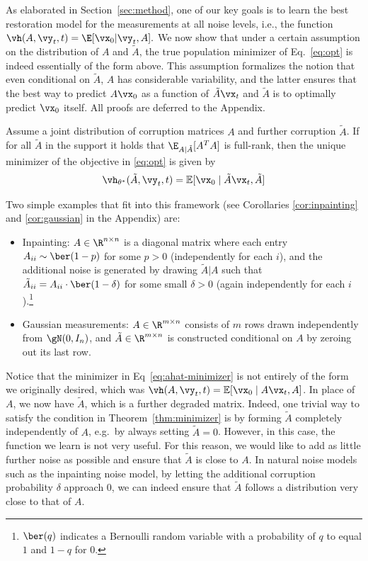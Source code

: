 \documentclass{article}
\begin{document}
As elaborated in Section~\ref{sec:method}, one of our key goals is to learn the best restoration model for the measurements at all noise levels, i.e., the function $
    \vh(A, \vy_t, t) = \E[\vx_0 | \vy_t, A].$
We now show that under a certain assumption on the distribution of $A$ and $\tilde{A}$, the true population minimizer of Eq.~\ref{eq:opt} is indeed essentially of the form above. This assumption formalizes the notion that even conditional on $\tilde{A}$, $A$ has considerable variability, and the latter ensures that the best way to predict $A\vx_0$ as a function of $\tilde{A}\vx_t$ and $\tilde{A}$ is to optimally predict $\vx_0$ itself. All proofs are deferred to the Appendix.

\begin{theorem}\label{thm:minimizer}
    Assume a joint distribution of corruption matrices $A$ and further corruption $\tilde{A}$. If for all $\tilde{A}$ in the support it holds that $\E_{A|\tilde{A}}[A^T A]$ is full-rank, then the unique minimizer of the objective in \eqref{eq:opt} is given by
    \begin{equation}\label{eq:ahat-minimizer}
        \vh_{\theta^*}(\tilde A, \vy_t, t ) = \mathbb{E}[ \vx_0 \mid \tilde{A}\vx_t, \tilde{A} ]
    \end{equation}
\end{theorem}

Two simple examples that fit into this framework (see Corollaries \ref{cor:inpainting} and \ref{cor:gaussian} in the Appendix) are: 
\begin{itemize}
    \item Inpainting: $A \in \R^{n \times n}$ is a diagonal matrix where each entry $A_{ii} \sim \ber(1-p)$ for some $p > 0$ (independently for each $i$), and the additional noise is generated by drawing $\tilde{A}|A$ such that $\tilde{A}_{ii} = A_{ii} \cdot \ber(1-\delta)$ for some small $\delta > 0$ (again independently for each $i$).\footnote{$\ber(q)$ indicates a Bernoulli random variable with a probability of $q$ to equal $1$ and $1-q$ for $0$.} 
    \item Gaussian measurements: $A \in \R^{m \times n}$ consists of $m$ rows drawn independently from $\gN(0, I_n)$, and $\tilde{A} \in \R^{m \times n}$ is constructed conditional on $A$ by zeroing out its last row.
\end{itemize}

Notice that the minimizer in Eq~\ref{eq:ahat-minimizer} is not entirely of the form we originally desired, which was $\vh(A, \vy_t, t) = \mathbb{E}[ \vx_0 \mid A\vx_t, A]$. In place of $A$, we now have $\tilde{A}$, which is a further degraded matrix. Indeed, one trivial way to satisfy the condition in Theorem~\ref{thm:minimizer} is by forming $\tilde{A}$ completely independently of $A$, e.g.\ by always setting $\tilde{A} = 0$. However, in this case, the function we learn is not very useful. For this reason, we would like to add as little further noise as possible and ensure that $\tilde{A}$ is close to $A$. In natural noise models such as the inpainting noise model, by letting the additional corruption probability $\delta$ approach $0$, we can indeed ensure that $\tilde{A}$ follows a distribution very close to that of $A$. %
\end{document}
